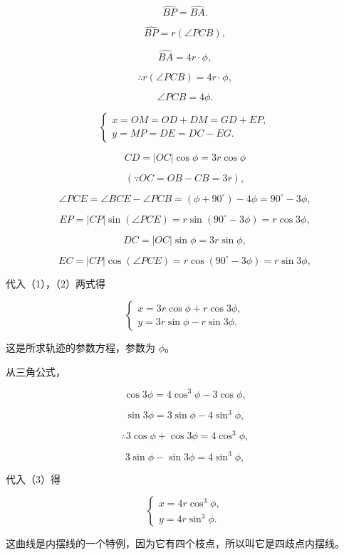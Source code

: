 \[
\widehat {BP} = \widehat {BA}.
\]

\[
\widehat {BP} = r (\angle PC B),
\]

\[
\widehat {BA} = 4 r \cdot \phi,
\]

\[
\therefore r (\angle PC B) = 4 r \cdot \phi,
\]

\[
\angle PC B = 4 \phi.
\]

\[
\left\{ \begin{array}{l} x = OM = OD + DM = GD + EP, \\ y = MP = DE = DC - EG. \end{array} \right. \tag {1}
\]

\[
CD = | OC | \cos \phi = 3 r \cos \phi
\]

\[
(\because OC = OB - CB = 3 r),
\]

\[
\angle PC E = \angle BC E - \angle PC B = (\phi + 90^{\circ}) - 4 \phi = 90^{\circ} - 3 \phi,
\]

\[
EP = | CP | \sin (\angle PC E) = r \sin (90^{\circ} - 3 \phi) = r \cos 3 \phi,
\]

\[
DC = | OC | \sin \phi = 3 r \sin \phi,
\]

\[
EC = | CP | \cos (\angle PC E) = r \cos (90^{\circ} - 3 \phi) = r \sin 3 \phi,
\]

代入（1），（2）两式得

\[
\left\{ \begin{array}{l} x = 3 r \cos \phi + r \cos 3 \phi, \\ y = 3 r \sin \phi - r \sin 3 \phi. \end{array} \right. \tag {3}
\]

这是所求轨迹的参数方程，参数为 \(\phi\)。

从三角公式，

\[
\cos 3 \phi = 4 \cos^{3} \phi - 3 \cos \phi,
\]

\[
\sin 3 \phi = 3 \sin \phi - 4 \sin^{3} \phi,
\]

\[
\therefore 3 \cos \phi + \cos 3 \phi = 4 \cos^{3} \phi,
\]

\[
3 \sin \phi - \sin 3 \phi = 4 \sin^{3} \phi,
\]

代入（3）得

\[
\left\{ \begin{array}{l} x = 4 r \cos^{3} \phi, \\ y = 4 r \sin^{3} \phi. \end{array} \right.
\]

这曲线是内摆线的一个特例，因为它有四个枝点，所以叫它是四歧点内摆线。

